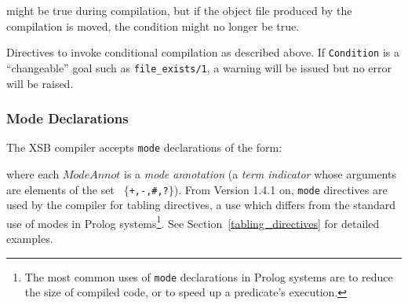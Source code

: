 might be true during compilation, but if the object file produced by
the compilation is moved, the condition might no longer be true.

\begin{description}
%
Directives to invoke conditional compilation as described above.  If
{\tt Condition} is a ``changeable'' goal such as {\tt file\_exists/1},
a warning will be issued but no error will be raised.
\end{description}


%
\subsubsection{Mode Declarations}\label{mode_declarations}

The XSB compiler accepts {\tt mode} declarations of the form:


\noindent
where each $ModeAnnot$ is a {\em mode annotation\/} (a {\em term
indicator\/} whose arguments are elements of the set {\tt
$\{$+,-,\#,?$\}$}).  From Version 1.4.1 on, {\tt mode} directives are
used by the compiler for tabling directives, a use which differs from
the standard use of modes in Prolog systems\footnote{The most common
uses of {\tt mode} declarations in Prolog systems are to reduce the
size of compiled code, or to speed up a predicate's execution.}.  See
Section~\ref{tabling_directives} for detailed examples.

